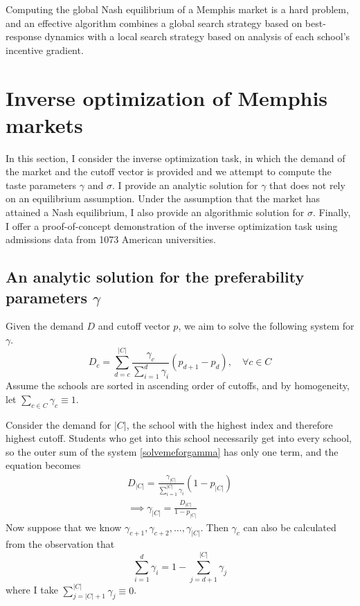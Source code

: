\documentclass[12pt]{article}
\numberwithin{equation}{subsection}
\theoremstyle{definition}
\begin{document}
Computing the global Nash equilibrium of a Memphis market is a hard problem, and an effective algorithm combines a global search strategy based on best-response dynamics with a local search strategy based on analysis of each school's incentive gradient. 




\section{Inverse optimization of Memphis markets}
In this section, I consider the inverse optimization task, in which the demand of the market and the cutoff vector is provided and we attempt to compute the taste parameters $\gamma$ and $\sigma$. I provide an analytic solution for $\gamma$ that does not rely on an equilibrium assumption. Under the assumption that the market has attained a Nash equilibrium, I also provide an algorithmic solution for $\sigma$. Finally, I offer a proof-of-concept demonstration of the inverse optimization task using admissions data from 1073 American universities. 

\subsection{An analytic solution for the preferability parameters $\gamma$}
Given the demand $D$ and cutoff vector $p$, we aim to solve the following system for $\gamma$.
\begin{equation}
D_c = \sum_{d=c}^{|C|} 
\frac{\gamma_c}{ \sum_{i=1}^d \gamma_i} 
\left(p_{d+1} - p_{d}\right),
\quad \forall c \in C
 \label{solvemeforgamma}
 \end{equation}
Assume the schools are sorted in ascending order of cutoffs, and by homogeneity, let $\sum_{c \in C} \gamma_c \equiv 1$.

Consider the demand for $|C|$, the school with the highest index and therefore highest cutoff. Students who get into this school necessarily get into every school, so the outer sum of the system \eqref{solvemeforgamma} has only one term, and the equation becomes
\begin{align}D_{|C|} =
\frac{\gamma_{|C|}}{ \sum_{i=1}^{|C|} \gamma_i} 
\left(1 - p_{|C|}\right) \\
\implies \gamma_{|C|} = \frac{D_{|C|}}{1 - p_{|C|}}
\end{align}
Now suppose that we know $\gamma_{c+1}, \gamma_{c+2}, \dots, \gamma_{|C|}$. Then $\gamma_c$ can also be calculated from the observation that
\[\sum_{i=1}^d \gamma_i = 1 - \sum_{j=d+1}^{|C|} \gamma_j\]
where I take $\sum_{j=|C|+1}^{|C|} \gamma_j \equiv 0$.
\end{document}
